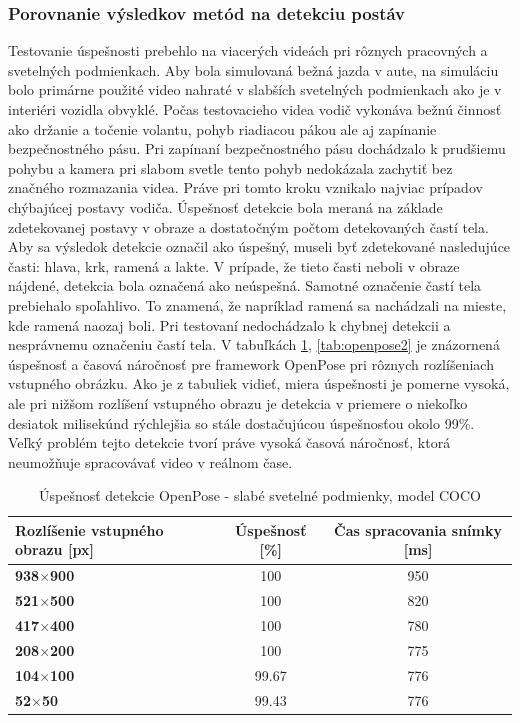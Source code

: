 \documentclass[slovak,master,dept460,male,cpp,cpdeclaration]{diploma}
\begin{document}
\subsubsection*{Porovnanie výsledkov metód na detekciu postáv}
\label{sec:compare}
Testovanie úspešnosti  prebehlo na viacerých videách pri rôznych  pracovných a svetelných  podmienkach. Aby bola simulovaná bežná  jazda v aute, na simuláciu bolo primárne použité video nahraté v slabších  svetelných podmienkach ako je v interiéri vozidla obvyklé. Počas testovacieho videa  vodič vykonáva bežnú činnosť ako držanie a točenie volantu, pohyb riadiacou pákou ale aj zapínanie  bezpečnostného pásu. Pri zapínaní bezpečnostného pásu dochádzalo k prudšiemu pohybu a  kamera pri slabom svetle tento pohyb nedokázala  zachytiť bez  značného rozmazania videa. Práve pri tomto  kroku vznikalo najviac  prípadov chýbajúcej postavy vodiča. Úspešnosť detekcie bola meraná na základe zdetekovanej postavy v obraze a dostatočným počtom detekovaných častí tela. Aby sa výsledok detekcie označil ako úspešný, museli byť zdetekované nasledujúce časti: hlava, krk, ramená a lakte. V prípade, že tieto časti neboli v obraze nájdené,  detekcia bola označená ako  neúspešná. Samotné označenie  častí tela prebiehalo spoľahlivo. To znamená, že napríklad ramená sa nachádzali na mieste, kde ramená naozaj boli. Pri testovaní nedochádzalo k chybnej  detekcii a nesprávnemu označeniu častí tela. V  tabuľkách \ref{tab:openpose1}, \ref{tab:openpose2} je znázornená úspešnosť a časová náročnosť pre framework OpenPose pri rôznych rozlíšeniach vstupného obrázku. Ako je z tabuliek vidieť, miera úspešnosti je pomerne vysoká, ale pri nižšom rozlíšení vstupného obrazu je detekcia v priemere o niekoľko desiatok milisekúnd  rýchlejšia  so stále dostačujúcou úspešnosťou okolo 99\%. Veľký problém tejto detekcie tvorí práve vysoká časová náročnosť, ktorá  neumožňuje spracovávať video v reálnom čase.

\begin{table}[H]
\begin{tabular}{|l|c|c|}
\hline
\textbf{Rozlíšenie vstupného obrazu [px]}        & \textbf{Úspešnosť [\%]}  & \textbf{Čas spracovania snímky [ms]} \\ \hline
\textbf{938$\times$900}      &   100           &   950        \\ \hline
\textbf{521$\times$500}      &   100           &   820        \\ \hline
\textbf{417$\times$400}      &   100           &   780        \\ \hline
\textbf{208$\times$200}      &   100           &   775        \\ \hline
\textbf{104$\times$100}      &   99.67         &   776        \\ \hline
\textbf{52$\times$50}       &   99.43          &   776        \\ \hline
\end{tabular}
	\caption{Úspešnosť detekcie OpenPose - slabé svetelné podmienky,  model COCO}
	\label{tab:openpose1}
\end{table}
\end{document}

